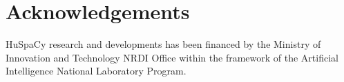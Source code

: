 \documentclass{llncs}
\begin{document}

\section*{Acknowledgements}
HuSpaCy research and developments has been financed by the Ministry of Innovation and Technology NRDI Office within the framework of the Artificial Intelligence National Laboratory Program.

%
\renewcommand\bibname{\refname}
\renewcommand\bibname{References}


\end{document}
